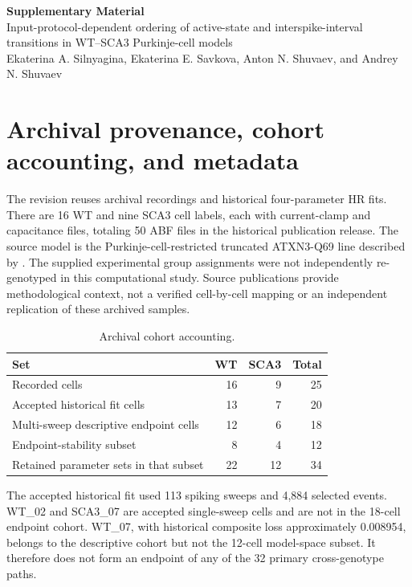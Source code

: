 \documentclass[11pt,a4paper]{article}
\begin{document}
\begin{center}{\Large\bfseries Supplementary Material}\\[5pt]
{\large Input-protocol-dependent ordering of active-state and interspike-interval transitions in WT--SCA3 Purkinje-cell models}\\[6pt]
Ekaterina A. Silnyagina, Ekaterina E. Savkova, Anton N. Shuvaev, and Andrey N. Shuvaev
\end{center}

\section{Archival provenance, cohort accounting, and metadata}\label{s:provenance}
The revision reuses archival recordings and historical four-parameter HR fits. There are 16 WT and nine SCA3 cell labels, each with current-clamp and capacitance files, totaling 50 ABF files in the historical publication release. The source model is the Purkinje-cell-restricted truncated ATXN3-Q69 line described by \citet{oue2009,konno2014}. The supplied experimental group assignments were not independently re-genotyped in this computational study. Source publications provide methodological context, not a verified cell-by-cell mapping or an independent replication of these archived samples.

\begin{table}[htbp]\centering\small
\caption{Archival cohort accounting.}\begin{tabularx}{\textwidth}{@{}Xrrr@{}}\toprule Set&WT&SCA3&Total\\\midrule Recorded cells&16&9&25\\Accepted historical fit cells&13&7&20\\Multi-sweep descriptive endpoint cells&12&6&18\\Endpoint-stability subset&8&4&12\\Retained parameter sets in that subset&22&12&34\\\bottomrule\end{tabularx}\end{table}

The accepted historical fit used 113 spiking sweeps and 4,884 selected events. WT\_02 and SCA3\_07 are accepted single-sweep cells and are not in the 18-cell endpoint cohort. WT\_07, with historical composite loss approximately 0.008954, belongs to the descriptive cohort but not the 12-cell model-space subset. It therefore does not form an endpoint of any of the 32 primary cross-genotype paths.
\end{document}

